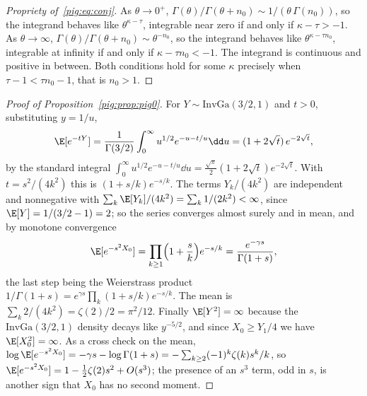 \begin{proof}[Propriety of~\eqref{pig:eq:conj}]
As $\theta\to0^+$, $\Gamma(\theta)/\Gamma(\theta+n_0)\sim1/(\theta\,\Gamma(n_0))$, so the integrand behaves like $\theta^{\kappa-\tau}$, integrable near zero if and only if $\kappa-\tau>-1$. As $\theta\to\infty$, $\Gamma(\theta)/\Gamma(\theta+n_0)\sim\theta^{-n_0}$, so the integrand behaves like $\theta^{\kappa-\tau n_0}$, integrable at infinity if and only if $\kappa-\tau n_0<-1$. The integrand is continuous and positive in between. Both conditions hold for some $\kappa$ precisely when $\tau-1<\tau n_0-1$, that is $n_0>1$.
\end{proof}

\begin{proof}[Proof of Proposition~\ref{pig:prop:pig0}]
For $Y\sim\mathrm{InvGa}(3/2,1)$ and $t>0$, substituting $y=1/u$,
\[
\E[e^{-tY}]=\frac{1}{\Gamma(3/2)}\int_0^\infty u^{1/2}e^{-u-t/u}\dd u=(1+2\sqrt t)\,e^{-2\sqrt t},
\]
by the standard integral $\int_0^\infty u^{1/2}e^{-u-t/u}\dd u=\tfrac{\sqrt\pi}{2}(1+2\sqrt t)e^{-2\sqrt t}$. With $t=s^2/(4k^2)$ this is $(1+s/k)e^{-s/k}$. The terms $Y_k/(4k^2)$ are independent and nonnegative with $\sum_k\E[Y_k]/(4k^2)=\sum_k 1/(2k^2)<\infty$, since $\E[Y]=1/(3/2-1)=2$; so the series converges almost surely and in mean, and by monotone convergence
\[
\E[e^{-s^2X_0}]=\prod_{k\ge1}\Bigl(1+\frac sk\Bigr)e^{-s/k}=\frac{e^{-\gamma s}}{\Gamma(1+s)},
\]
the last step being the Weierstrass product $1/\Gamma(1+s)=e^{\gamma s}\prod_k(1+s/k)e^{-s/k}$. The mean is $\sum_k 2/(4k^2)=\zeta(2)/2=\pi^2/12$. Finally $\E[Y^2]=\infty$ because the $\mathrm{InvGa}(3/2,1)$ density decays like $y^{-5/2}$, and since $X_0\ge Y_1/4$ we have $\E[X_0^2]=\infty$. As a cross check on the mean, $\log\E[e^{-s^2X_0}]=-\gamma s-\log\Gamma(1+s)=-\sum_{k\ge2}(-1)^k\zeta(k)s^k/k$, so $\E[e^{-s^2X_0}]=1-\tfrac12\zeta(2)s^2+O(s^3)$; the presence of an $s^3$ term, odd in $s$, is another sign that $X_0$ has no second moment.
\end{proof}

